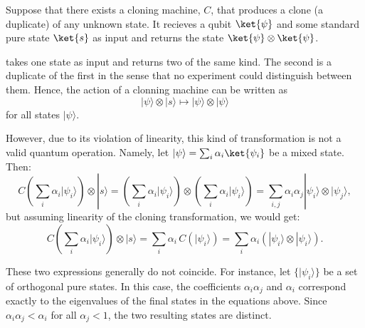 Suppose that there exists a cloning machine, $C$, that produces a clone (a duplicate) of any unknown state. It recieves a qubit $\ket{\psi}$ and some standard pure state $\ket{s}$ as input and returns the state $\ket{\psi} \otimes \ket{\psi}$.

takes one state as input and returns two of the same kind. The second is a duplicate of the first in the sense that no experiment could distinguish between them. Hence, the action of a clonning machine can be written as
\[
|\psi\rangle \otimes |s\rangle \mapsto |\psi\rangle \otimes |\psi\rangle
\]
for all states $|\psi\rangle$.

However, due to its violation of linearity, this kind of transformation is not a valid quantum operation. Namely, let $|\psi\rangle = \sum_i \alpha_i \ket{\psi_i}$ be a mixed state. Then:
\begin{equation*}
C \left( \sum_i \alpha_i |\psi_i\rangle \right) \otimes |s\rangle 
=
 \left( \sum_i \alpha_i |\psi_i\rangle \right) \otimes  \left( \sum_i \alpha_i |\psi_i\rangle \right)  =  \sum_{i,j} \alpha_i \alpha_j |\psi_i\rangle \otimes |\psi_j\rangle,
\end{equation*}
but assuming linearity of the cloning transformation, we would get:
\begin{equation*}
 C \left( \sum_i \alpha_i |\psi_i\rangle \right)  \otimes |s\rangle =  \sum_i \alpha_i \, C \left(|\psi_i\rangle \right)
=
\sum_i \alpha_i \left( |\psi_i\rangle \otimes |\psi_i\rangle \right).
\end{equation*}

These two expressions generally do not coincide. For instance, let $\{|\psi_i\rangle\}$ be a set of orthogonal pure states. In this case, the coefficients $\alpha_i \alpha_j $ and $\alpha_i$ correspond exactly to the eigenvalues of the final states in the equations above. Since $ \alpha_i \alpha_j < \alpha_i$ for all $\alpha_j< 1$, the two resulting states are distinct.


